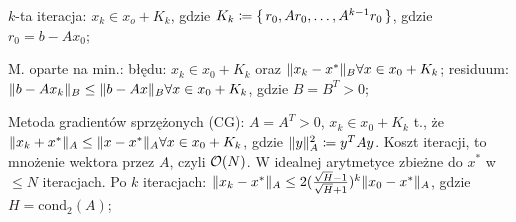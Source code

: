 
\entry
$k$-ta iteracja:
$x_k\in x_o+K_k$,
gdzie $K_k\coloneqq \set{r_0, Ar_0,\ldots, A^{k-1}r_0}$,
gdzie $r_0=b-Ax_0$;

\entry
M. oparte na min.:
błędu:
$x_k\in x_0 +K_k$ oraz $\|x_k - x^*\|_B \forall x\in x_0 + K_k$;
residuum:
$\|b-Ax_k\|_B \leq \|b-Ax\|_B \forall x\in x_0 +K_k$, gdzie $B=B^T>0$;

\entry
Metoda gradientów sprzężonych (CG):
$A=A^T>0$, $x_k\in x_0 + K_k$ t.,
że $\|x_k+x^*\|_A\leq \|x-x^*\|_A \forall x\in x_0 + K_k$,
gdzie $\|y\|^2_A \coloneqq y^TAy$.
Koszt iteracji, to mnożenie wektora przez $A$, czyli $\mathcal{O}(N)$.
W idealnej arytmetyce zbieżne do $x^*$ w $\leq N$ iteracjach.
Po $k$ iteracjach:
$\|x_k - x^*\|_A\leq 2(\frac{\sqrt{H} - 1}{\sqrt{H} + 1})^k\|x_0-x^*\|_A$,
gdzie $H=\mathrm{cond}_2(A)$;

